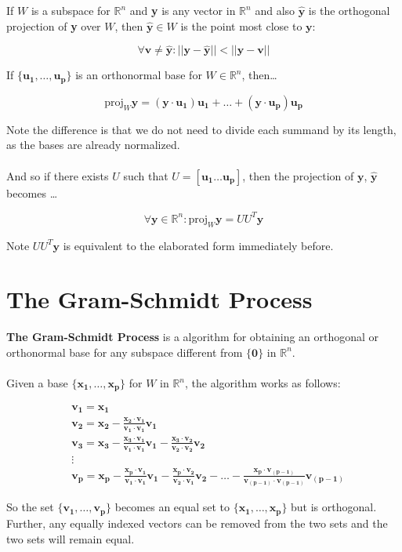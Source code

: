 \documentclass[12pt]{article}
\newcommand{\R}{\mathbb{R}}
\newcommand{\bt}[1]{\textbf{{#1}}}
\newcommand{\bm}[1]{\mathbf{{#1}}}
\newcommand{\set}[1]{\{{#1}\}}
\newcommand{\norm}[1]{||{#1}||}
\begin{document}
If $W$ is a subspace for $\R^n$ and \bt{y} is any vector in $\R^n$ and also $\bm{\hat{y}}$ is the orthogonal projection
of \bt{y} over $W$, then $\bm{\hat{y}} \in W$ is the point most close to $\bm{y}$:

$$\forall \bm{v \neq \hat{y}}: \norm{\bm{y - \hat{y}}} < \norm{\bm{y - v}}$$

If $\set{\bm{u_1,\dots,u_p}}$ is an orthonormal base for $W \in \R^n$, then\dots

$$\textrm{proj}_W\bm{y} = (\bm{y}\cdot\bm{u_1})\bm{u_1} + \dots + (\bm{y}\cdot\bm{u_p})\bm{u_p}$$

Note the difference is that we do not need to divide each summand by its length, as the bases are already normalized. \\ \\

And so if there exists $U$ such that $U = [\bm{u_1} \dots \bm{u_p}]$, then the projection of $\bm{y}$, $\bm{\hat{y}}$ becomes \dots

$$\forall \bm{y} \in \R^n: \textrm{proj}_W\bm{y} = UU^T\bm{y}$$

Note $UU^T\bm{y}$ is equivalent to the elaborated form immediately before.

\section*{The Gram-Schmidt Process}

\bt{The Gram-Schmidt Process} is a algorithm for obtaining an orthogonal or
orthonormal base for any subspace different from $\set{\bm{0}}$ in $\R^n$. \\ \\

Given a base $\set{\bm{x_1,\dots,x_p}}$ for $W$ in $\R^n$, the algorithm works as follows:

\begin{align*}
    & \bm{v_1 = x_1} \\
    & \bm{v_2 = x_2 - \frac{x_2 \cdot v_1}{v_1 \cdot v_1}v_1} \\
    & \bm{v_3 = x_3 - \frac{x_3 \cdot v_1}{v_1 \cdot v_1}v_1 - \frac{x_3 \cdot v_2}{v_2 \cdot v_2}v_2} \\
    & \vdots \\
    & \bm{v_p = x_p - \frac{x_p\cdot v_1}{v_1\cdot v_1}v_1 - \frac{x_p\cdot v_2}{v_2\cdot v_1}v_2 - \dots - \frac{x_p\cdot v_{(p-1)}}{v_{(p-1)}\cdot v_{(p-1)}}v_{(p-1)}}
\end{align*}

So the set $\set{\bm{v_1,\dots,v_p}}$ becomes an equal set to $\set{\bm{x_1,\dots,x_p}}$ but is orthogonal. Further,
any equally indexed vectors can be removed from the two sets and the two sets will remain equal. \\ \\
\end{document}
